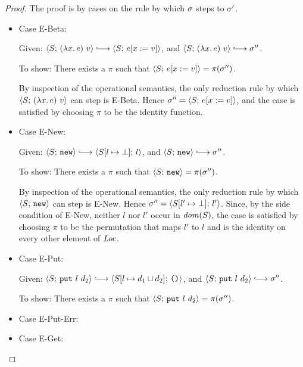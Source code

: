\begin{proof}
  The proof is by cases on the rule by which $\sigma$ steps to
  $\sigma'$.

  \begin{itemize}

    \item Case {\sc E-Beta}:

      Given:
      $\config{S}{\app{(\lam{x}{e})}{v}} \parstepsto \config{S}{\subst{e}{x}{v}}$,
      and $\config{S}{\app{(\lam{x}{e})}{v}} \parstepsto \conf''$.

      To show: There exists a $\pi$ such that
      $\langle S;\, e[x := v] \rangle = \pi(\sigma'')$.

      By inspection of the operational semantics, the only reduction
      rule by which $\langle S;\, (\lambda x.\,e)~v \rangle$ can step is
      {\sc E-Beta}.  Hence $\sigma'' = \langle S;\, e[x := v] \rangle$,
      and the case is satisfied by choosing $\pi$ to be the identity
      function.

      \item Case {\sc E-New}: 

      Given:
      $\config{S}{\NEW} \parstepsto \config{\extSRaw{S}{l}{\bot}}{l}$,
      and $\config{S}{\NEW} \parstepsto \conf''$.

      To show: There exists a $\pi$ such that $\langle S;\, \mbox{\texttt{new}} \rangle
      = \pi(\sigma'')$.

      By inspection of the operational semantics, the only reduction
      rule by which $\langle S;\, \mbox{\texttt{new}} \rangle$ can step is {\sc E-New}.  Hence
      $\sigma'' = \langle S[l' \mapsto \bot];\, l' \rangle$.  Since, by the
      side condition of {\sc E-New}, neither $l$ nor $l'$ occur in
      $\mathit{dom}(S)$, the case is satisfied by choosing $\pi$ to be the
      permutation that maps $l'$ to $l$ and is the identity on every
      other element of $\mathit{Loc}$.

      \item Case {\sc E-Put}:

      Given:
      $\config{S}{\putexp{l}{d_2}} \parstepsto \config{\extSRaw{S}{l}{\userlub{d_1}{d_2}}}{\unit}$,
      and $\config{S}{\putexp{l}{d_2}} \parstepsto \conf''$.

      To show: There exists a $\pi$ such that
      $\langle S;\, \mbox{\texttt{put}}~l~d_2 \rangle = \pi(\sigma'')$.


      \item Case {\sc E-Put-Err}: \TODO{}
      \item Case {\sc E-Get}: \TODO{}
  \end{itemize}
\end{proof}

